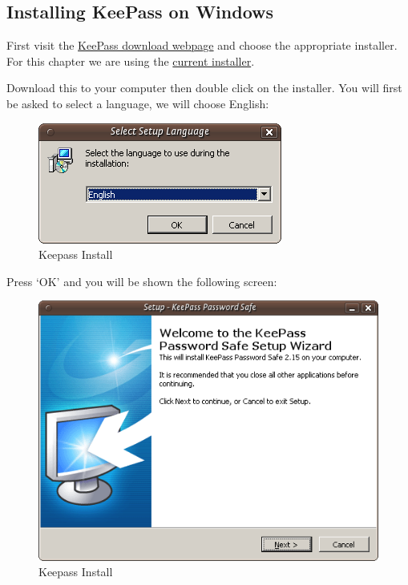 \subsection{Installing KeePass on Windows}

First visit the \href{http://keepass.info/download.html}{KeePass
download webpage} and choose the appropriate installer. For this chapter
we are using the
\href{http://downloads.sourceforge.net/keepass/KeePass-2.15-Setup.exe}{current
installer}.

Download this to your computer then double click on the installer. You
will first be asked to select a language, we will choose English:

\begin{figure}[htbp]
\centering
\includegraphics{keepass_2.png}
\caption{Keepass Install}
\end{figure}

Press `OK' and you will be shown the following screen:

\begin{figure}[htbp]
\centering
\includegraphics{keepass_3.png}
\caption{Keepass Install}
\end{figure}

